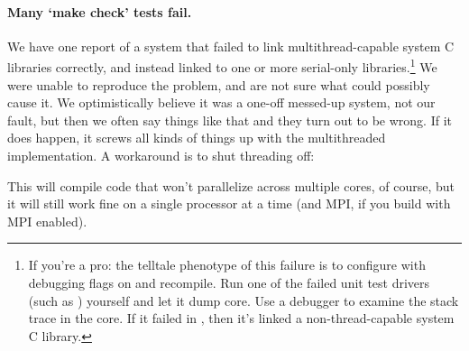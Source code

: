 \paragraph{Many `make check' tests fail.} We have one report of a
system that failed to link multithread-capable system C libraries
correctly, and instead linked to one or more serial-only
libraries.\footnote{If you're a pro: the telltale phenotype of this
  failure is to configure with debugging flags on and recompile. Run
  one of the failed unit test drivers (such as
  ) yourself and let it dump core. Use a
  debugger to examine the stack trace in the core. If it failed in
  , then it's linked a non-thread-capable
  system C library.} We were unable to reproduce the problem, and are
not sure what could possibly cause it. We optimistically believe it
was a one-off messed-up system, not our fault, but then we often say
things like that and they turn out to be wrong. If it does happen, it
screws all kinds of things up with the multithreaded implementation. A
workaround is to shut threading off:

  \vspace{1ex}
  \vspace{1ex}

This will compile code that won't parallelize across multiple cores, of
course, but it will still work fine on a single processor at a time
(and MPI, if you build with MPI enabled).

